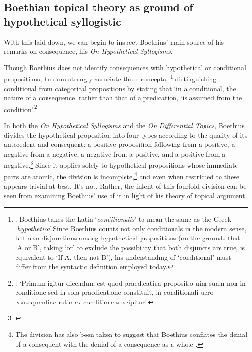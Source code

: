 \documentclass[a4paper, 11pt]{article}
\begin{document}
\subsection{Boethian topical theory as ground of hypothetical syllogistic}
With this laid down, we can begin to inspect Boethius' main source of his remarks on consequence, his \emph{On Hypothetical Syllogisms}. 

Though Boethius does not identify consequences with hypothetical or conditional propositions, he does strongly associate these concepts, \footnote{\autocite[1.3.2]{BHS}. Boethius takes the Latin `\emph{conditionalis}' to mean the same as the Greek `\emph{hypothetica}'.Since Boethius counts not only conditionals in the modern sense, but also disjunctions among hypothetical propositions (on the grounds that `A or B', taking `or' to exclude the possibility that both disjuncts are true, is equivalent to `If A, then not B'), his understanding of `conditional' must differ from the syntactic definition employed today.} distinguishing conditional from categorical propositions by stating that `in a conditional, the nature of a consequence' rather than that of a predication, `is assumed from the condition'.\footnote{\autocite[1.1.6]{BHS}: `Primum igitur dicendum est quod praedicatiua propositio uim suam non in conditione sed in sola praedicatione constituit, in conditionali uero consequentiae ratio ex conditione suscipitur'.} 

In both the \emph{On Hypothetical Syllogisms} and the \emph{On Differential Topics}, 
Boethius divides the hypothetical proposition into four types according to the quality of its antecedent and consequent: 
a positive proposition following from a positive, 
a negative from a negative, 
a negative from a positive, 
and a positive from a negative.\footnote{\autocite[1.3.5]{BHS} \autocite[1176B-C]{BDT}} Since it applies solely to hypothetical propositions whose immediate parts are atomic, the division is incomplete,\footnote{The division has also been taken to suggest that Boethius conflates the denial of a consequent with the denial of a consequence as a whole \autocite[157-158]{Martin2007}.} and even when restricted to these appears trivial at best. It's not. Rather, the intent of this fourfold division can be seen from examining Boethius' use of it in light of his theory of topical argument.
\end{document}
